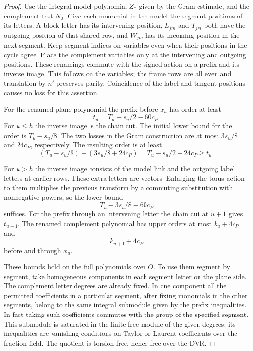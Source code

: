 \begin{proof}
\label{par:plane-reassembly}
Use the integral model polynomial \(Z_*\) given by the Gram
estimate, and the complement test \(N_0\). Give each monomial
in the model the segment positions of its letters. A block letter
has its intervening position, \(L_{jm}\) and \(T_{jm}\) both have
the outgoing position of that shared row, and \(W_{jm}\) has
its incoming position in the next segment. Keep segment indices
on variables even when their positions in the cycle agree. Place
the complement variables only at the intervening and outgoing
positions. These renamings commute with the signed action on a
prefix and its inverse image. This follows on the variables;
the frame rows are all even and translation by \(n'\) preserves
parity. Coincidence of the label and tangent positions causes
no loss for this assertion.

For the renamed plane polynomial the prefix before \(x_u\)
has order at least
\[
                        t_u=T_u-s_u/2-60c_P .
\]
For \(u\le h\) the inverse image is the chain cut. The initial lower bound for the order is \(T_u-s_u/8\).
The two losses in the Gram construction are at most \(3s_u/8\) and
\(24c_P\), respectively. The resulting order is at least
\[
 (T_u-s_u/8)-(3s_u/8+24c_P)=T_u-s_u/2-24c_P\ge t_u .
\]

For \(u>h\) the inverse
image consists of the model link and the outgoing label letters
at earlier rows. These extra letters are vectors. Enlarging the
torus action to them multiplies the previous transform by a
commuting substitution with nonnegative powers, so the lower
bound
\[
 T_u-3s_u/8-60c_P
\]
suffices. For the prefix through an
intervening letter the chain cut at \(u+1\) gives \(t_{u+1}\).
The renamed complement polynomial has upper orders at most
\(k_u+4c_P\) and
\[
 k_{u+1}+4c_P
\]
before and through \(x_u\).

These bounds hold on the full polynomials over \(O\). To use them
segment by segment, take homogeneous components in each
segment letter on the plane side. The complement letter degrees
are already fixed. In one component all the permitted coefficients
in a particular segment, after fixing monomials in the other
segments, belong to the same integral submodule given by the
prefix inequalities. In fact taking such coefficients commutes
with the group of the specified segment. This submodule is
saturated in the finite free module of the given degrees:
its inequalities are vanishing conditions on Taylor or Laurent
coefficients over the fraction field. The quotient is torsion free,
hence free over the DVR.


\end{proof}

